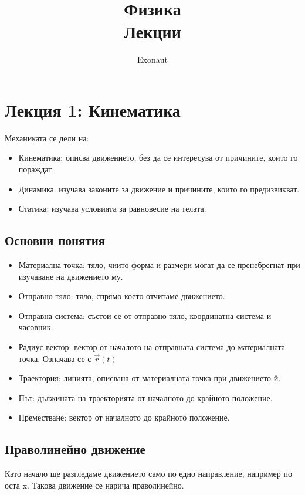 \documentclass[fleqn, 12pt]{article}
\title{Физика \\ Лекции}
\author{Exonaut}
\theoremstyle{definition}
\begin{document}
\maketitle
{}
\newpage
{}

\tableofcontents
\newpage

\section{Лекция 1: Кинематика}
Механиката се дели на: 
\begin{itemize}
	\item Кинематика: описва движението, без да се интересува от причините, които го пораждат.
	\item Динамика: изучава законите за движение и причините, които го предизвикват.
	\item Статика: изучава условията за равновесие на телата.
\end{itemize}

\subsection{Основни понятия}

\begin{itemize}
	\item Материална точка: тяло, чиито форма и размери могат да се пренебрегнат при изучаване на движението му.
	\item Отправно тяло: тяло, спрямо което отчитаме движението.
	\item Отправна система: състои се от отправно тяло, координатна система и часовник.
	\item Радиус вектор: вектор от началото на отправната система до материалната точка. Означава се с $\vec{r}(t)$
	\item Траектория: линията, описвана от материалната точка при движението й.
	\item Път: дължината на траекторията от началното до крайното положение.
	\item Преместване: вектор от началното до крайното положение.
\end{itemize}

\subsection{Праволинейно движение}
Като начало ще разгледаме движението само по едно направление, например по оста x. Такова движение се нарича праволинейно.
\end{document}
